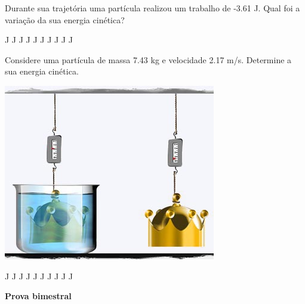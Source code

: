 \documentclass[12pt, addpoints]{exam}
\begin{document}
\begin{questions}
\begin{multicols}{2}
\question[33] Durante sua trajetória uma partícula realizou um trabalho de   -3.61 J. Qual foi a variação da sua energia cinética?
\begin{oneparchoices}
 J J J J J J J J J J\end{oneparchoices}
\question[23] Considere uma partícula de massa    7.43 kg e velocidade    2.17 m/s. Determine a sua energia cinética.
\begin{center}
\begin{minipage}[c]{0.75\linewidth}
\includegraphics[width=\textwidth]{MWE001.jpg}
\end{minipage}
\end{center}
\begin{oneparchoices}
 J J J J J J J J J J\end{oneparchoices}
\end{multicols}
\end{questions}
\newpage
\begin{minipage}[l]{0.5\linewidth}
    \begin{flushleft}
        {\bf \Large Prova bimestral}
    \end{flushleft}
\end{minipage}
\end{document}
